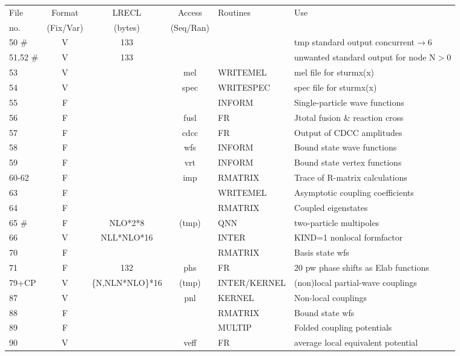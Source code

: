 \documentclass[11pt]{article}
\begin{document}
{\begin{tabular}{|l | c c c | l | l|}
\hline
File & Format & LRECL  & Access & Routines & Use \\
 no. & (Fix/Var) & (bytes) & (Seq/Ran) &  &  \\
\hline
50  \#  & V &   133  &    &    &    tmp standard output concurrent$\rightarrow$6\\
51,52 \#  & V &   133  &    &  & unwanted standard output for node N$>$0\\
53    &   V &            &  mel  &     WRITEMEL & mel file for sturmx(x)\\
54    &   V &            &   spec  &     WRITESPEC & spec file for sturmx(x)\\
55    &   F &            &    &     INFORM & Single-particle wave functions\\
56    &   F &            &  fusl  &     FR & Jtotal fusion \& reaction cross\\
57    &   F &            &   cdcc &     FR & Output of CDCC amplitudes\\
58    &   F &            &  wfs  &     INFORM & Bound state wave functions \\
59    &   F &            &   vrt &     INFORM & Bound state vertex functions \\
60-62 &   F &            &  imp  &     RMATRIX & Trace of R-matrix calculations\\
63    &   F &            &    &     WRITEMEL& Asymptotic coupling coefficients\\
64    &   F &            &    &     RMATRIX& Coupled eigenstates\\
65 \# &  F  &   NLO*2*8  & (tmp)   &     QNN  &  two-particle multipoles\\
66    &  V  &NLL*NLO*16  & &     INTER & KIND=1 nonlocal formfactor\\
70    &   F &            &    &     RMATRIX& Basis state wfs\\
71    &   F &    132     &phs &     FR   &  20 pw phase shifts as Elab functions\\
79+CP  &  V &\{N,NLN*NLO\}*16 & (tmp)  &   INTER/KERNEL &(non)local partial-wave couplings\\
87    &   V &            &   pnl &     KERNEL & Non-local couplings\\
88    &   F &            &    &     RMATRIX& Bound state wfs\\
89    &   F &            &    &     MULTIP& Folded coupling potentials\\
90    &  V &           &veff &       FR   &   average local equivalent potential\\

\end{tabular}}
\end{document}
